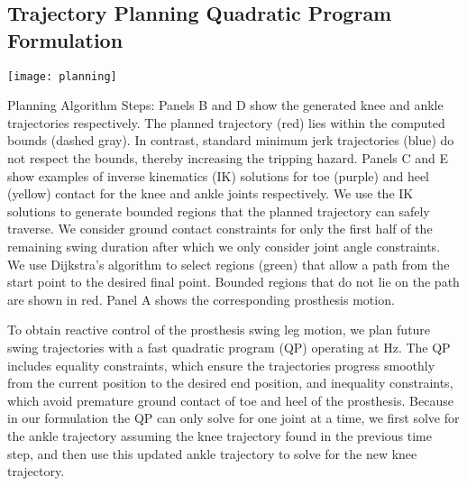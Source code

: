 \subsection{Trajectory Planning Quadratic Program Formulation}
\label{sec:traj_plan}

\begin{pagefigure}
    \texttt{[image: planning]}
    \caption{Planning Algorithm Steps: Panels B and D
    show the generated knee and ankle trajectories respectively.  The planned
    trajectory (red) lies within the computed bounds (dashed gray).  In
    contrast, standard minimum jerk trajectories (blue) do not respect the
    bounds, thereby increasing the tripping hazard. Panels C and E show examples
    of inverse kinematics (IK) solutions for toe (purple) and heel (yellow)
    contact for the knee and ankle joints respectively. We use the IK solutions
    to generate bounded regions that the planned trajectory can safely traverse.
    We consider ground contact constraints for only the first half of the
    remaining swing duration after which we only consider joint angle
    constraints. We use Dijkstra's algorithm to select regions (green) that
    allow a path from the start point to the desired final point. Bounded
    regions that do not lie on the path are shown in red. Panel A shows the
    corresponding prosthesis motion.}\label{fig:planning}
\end{pagefigure}

To obtain reactive control of the prosthesis swing leg motion, we plan future
swing trajectories with a fast quadratic program (QP) operating at
\unit[100]{Hz}. The QP includes equality constraints, which ensure the
trajectories progress smoothly from the current position to the desired end
position, and inequality constraints, which avoid premature ground contact of
toe and heel of the prosthesis. Because in our formulation the QP can only solve
for one joint at a time, we first solve for the ankle trajectory assuming the
knee trajectory found in the previous time step, and then use this updated ankle
trajectory to solve for the new knee trajectory.

